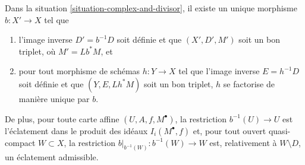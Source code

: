 \begin{lemma}
\label{lemma-complex-and-divisor-blowup-pre}
Dans la situation \ref{situation-complex-and-divisor},
il existe un unique morphisme $b : X' \to X$ tel que
\begin{enumerate}
\item l'image inverse $D' = b^{-1}D$ soit définie et que
$(X', D', M')$ soit un bon triplet, où $M' = Lb^*M$, et
\item pour tout morphisme de schémas $h : Y \to X$ tel que
l'image inverse $E = h^{-1}D$ soit définie et que $(Y, E, Lh^*M)$
soit un bon triplet, $h$ se factorise de manière unique par $b$.
\end{enumerate}
De plus, pour toute carte affine $(U, A, f, M^\bullet)$, la restriction
$b^{-1}(U) \to U$ est l'éclatement dans le produit des idéaux
$I_i(M^\bullet, f)$ et, pour tout ouvert quasi-compact $W \subset X$, la
restriction $b|_{b^{-1}(W)} : b^{-1}(W) \to W$ est, relativement à $W \setminus D$, un
éclatement admissible.
\end{lemma}

